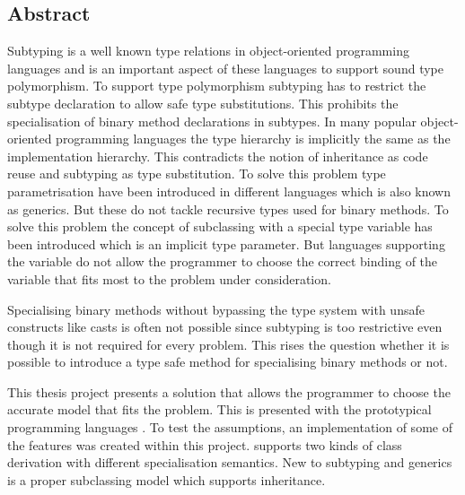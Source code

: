 %
%
\subsection*{Abstract}
Subtyping is a well known type relations in object-oriented
programming languages and is an important aspect of these languages
to support sound type polymorphism. To support type polymorphism
subtyping has to restrict the subtype declaration to allow safe type
substitutions. This prohibits the specialisation of binary method declarations 
in subtypes. In many popular object-oriented programming languages the type
hierarchy is implicitly the same as the implementation hierarchy. This
contradicts the notion of inheritance as code reuse and subtyping as type
substitution. To solve this problem type parametrisation have been introduced in
different languages which is also known as generics. But these do not
tackle recursive types used for binary methods. To solve this problem
the concept of subclassing with a special type variable \mytype has been
introduced which is an implicit type parameter. But languages supporting
the \mytype variable do not allow the programmer to choose the correct
binding of the variable that fits most to the problem under consideration.

Specialising binary methods without bypassing the type system with
unsafe constructs like casts is often not possible since subtyping is
too restrictive even though it is not required for every problem. This
rises the question whether it is possible to introduce a type safe method
for specialising binary methods or not.

This thesis project presents a solution that allows the programmer to
choose the accurate model that fits the problem. This is presented
with the prototypical programming languages \ooplss. To test the
assumptions, an implementation of some of the features was created
within this project. \ooplss supports two kinds of class derivation
with different specialisation semantics. New to subtyping and generics
is a proper subclassing model which supports inheritance.

